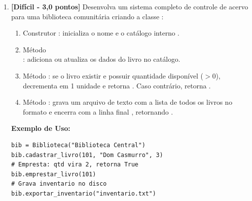 \begin{enumerate}[label=\textbf{Q\arabic*.}, start=64]


\vspace{0.4cm}

\item \textbf{[Difícil - 3,0 pontos]} Desenvolva um sistema completo de controle de acervo para uma biblioteca comunitária criando a classe :
\begin{enumerate}
    \item Construtor : inicializa o nome e o catálogo interno .
    \item Método \\: adiciona ou atualiza os dados do livro no catálogo.
    \item Método : se o livro existir e possuir quantidade disponível ($> 0$), decrementa em 1 unidade e retorna . Caso contrário, retorna .
    \item Método : grava um arquivo de texto com a lista de todos os livros no formato  e encerra com a linha final , retornando .
\end{enumerate}

\textbf{Exemplo de Uso:}
\begin{verbatim}
bib = Biblioteca("Biblioteca Central")
bib.cadastrar_livro(101, "Dom Casmurro", 3)
# Empresta: qtd vira 2, retorna True
bib.emprestar_livro(101)
# Grava inventario no disco
bib.exportar_inventario("inventario.txt")
\end{verbatim}



\vspace{0.4cm}

\end{enumerate}
